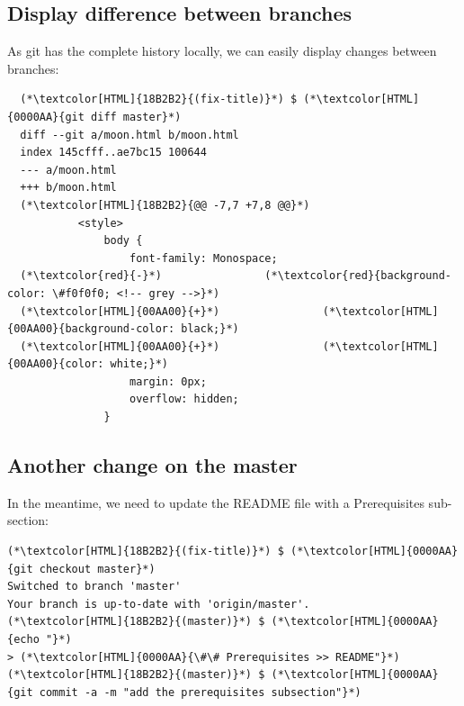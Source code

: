 \subsection{Display difference between branches}
\begin{frame}[fragile]
  \subslidetitle

  As git has the complete history locally, we can easily display changes between branches:

  \begin{lstlisting}
  (*\textcolor[HTML]{18B2B2}{(fix-title)}*) $ (*\textcolor[HTML]{0000AA}{git diff master}*)
  diff --git a/moon.html b/moon.html
  index 145cfff..ae7bc15 100644
  --- a/moon.html
  +++ b/moon.html
  (*\textcolor[HTML]{18B2B2}{@@ -7,7 +7,8 @@}*)
           <style>
               body {
                   font-family: Monospace;
  (*\textcolor{red}{-}*)                (*\textcolor{red}{background-color: \#f0f0f0; <!-- grey -->}*)
  (*\textcolor[HTML]{00AA00}{+}*)                (*\textcolor[HTML]{00AA00}{background-color: black;}*)
  (*\textcolor[HTML]{00AA00}{+}*)                (*\textcolor[HTML]{00AA00}{color: white;}*)
                   margin: 0px;
                   overflow: hidden;
               }
\end{lstlisting}
\end{frame}

\subsection{Another change on the master}
\begin{frame}[fragile]
  \subslidetitle

  In the meantime, we need to update the README file with a Prerequisites sub-section:
  \begin{lstlisting}
(*\textcolor[HTML]{18B2B2}{(fix-title)}*) $ (*\textcolor[HTML]{0000AA}{git checkout master}*)
Switched to branch 'master'
Your branch is up-to-date with 'origin/master'.
(*\textcolor[HTML]{18B2B2}{(master)}*) $ (*\textcolor[HTML]{0000AA}{echo "}*)
> (*\textcolor[HTML]{0000AA}{\#\# Prerequisites >> README"}*)
(*\textcolor[HTML]{18B2B2}{(master)}*) $ (*\textcolor[HTML]{0000AA}{git commit -a -m "add the prerequisites subsection"}*)
\end{lstlisting}

\end{frame}



